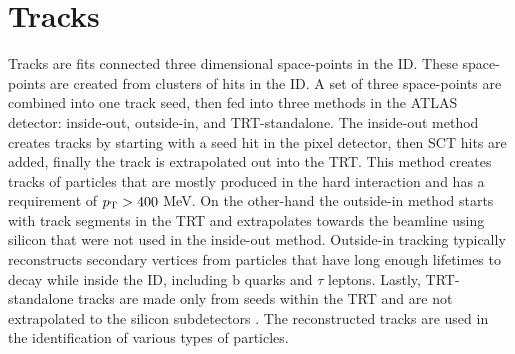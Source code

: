 	\section{Tracks}
	Tracks are fits connected three dimensional space-points in the ID. These space-points are created from clusters of hits in the ID. A set of three space-points are combined into one track seed, then fed into three methods in the ATLAS detector: inside-out,  outside-in, and TRT-standalone. The inside-out method creates tracks by starting with a seed hit in the pixel detector, then SCT hits are added, finally the track is extrapolated out into the TRT. This method creates tracks of particles that are mostly produced in the hard \pp interaction and has a requirement of $p_{\text{T}}>400$ MeV. On the other-hand the outside-in method starts with track segments in the TRT and extrapolates towards the beamline using silicon that were not used in the inside-out method. Outside-in tracking typically reconstructs secondary vertices from particles that have long enough lifetimes to decay while inside the ID, including b quarks and $\tau$ leptons. Lastly, TRT-standalone tracks are made only from seeds within the TRT and are not extrapolated to the silicon subdetectors  \cite{ATLAS-perf-run2}. The reconstructed tracks are used in the identification of various types of particles.


